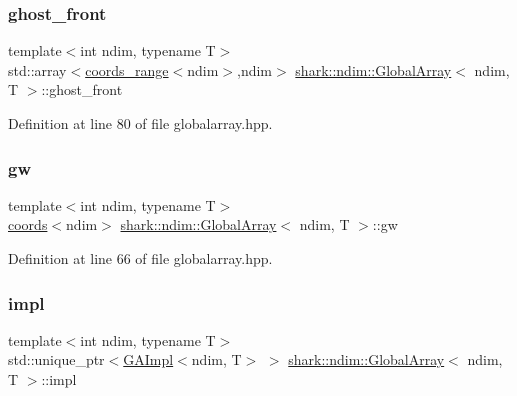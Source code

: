 \subsubsection{\texorpdfstring{ghost\+\_\+front}{ghost\_front}}
{\footnotesize\ttfamily template$<$int ndim, typename T$>$ \\
std\+::array$<$\hyperlink{structshark_1_1ndim_1_1coords__range}{coords\+\_\+range}$<$ndim$>$,ndim$>$ \hyperlink{classshark_1_1ndim_1_1_global_array}{shark\+::ndim\+::\+Global\+Array}$<$ ndim, T $>$\+::ghost\+\_\+front\hspace{0.3cm}{\ttfamily [private]}}



Definition at line 80 of file globalarray.\+hpp.

\hypertarget{classshark_1_1ndim_1_1_global_array_a38d93d114d585e5e5491c5ecd35c6bfc}{}\label{classshark_1_1ndim_1_1_global_array_a38d93d114d585e5e5491c5ecd35c6bfc} 
\subsubsection{\texorpdfstring{gw}{gw}}
{\footnotesize\ttfamily template$<$int ndim, typename T$>$ \\
\hyperlink{structshark_1_1ndim_1_1coords}{coords}$<$ndim$>$ \hyperlink{classshark_1_1ndim_1_1_global_array}{shark\+::ndim\+::\+Global\+Array}$<$ ndim, T $>$\+::gw\hspace{0.3cm}{\ttfamily [private]}}



Definition at line 66 of file globalarray.\+hpp.

\hypertarget{classshark_1_1ndim_1_1_global_array_a70684121da4badfef791c15d7076282f}{}\label{classshark_1_1ndim_1_1_global_array_a70684121da4badfef791c15d7076282f} 
\subsubsection{\texorpdfstring{impl}{impl}}
{\footnotesize\ttfamily template$<$int ndim, typename T$>$ \\
std\+::unique\+\_\+ptr$<$\hyperlink{classshark_1_1ndim_1_1_g_a_impl}{G\+A\+Impl}$<$ndim, T$>$ $>$ \hyperlink{classshark_1_1ndim_1_1_global_array}{shark\+::ndim\+::\+Global\+Array}$<$ ndim, T $>$\+::impl}



